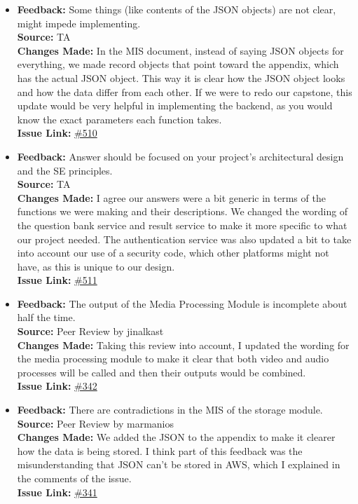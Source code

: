 \documentclass{article}
\begin{document}
\begin{itemize}
    \item
      \textbf{Feedback:} Some things (like contents of the JSON objects) are not clear, might impede implementing. \\
      \textbf{Source:} TA \\
      \textbf{Changes Made:} In the MIS document, instead of saying JSON objects for everything, we made record objects that point toward the appendix, which has the actual JSON object. This way it is clear how the JSON object looks and how the data differ from each other. If we were to redo our capstone, this update would be very helpful in implementing the backend, as you would know the exact parameters each function takes. \\
      \textbf{Issue Link:} \href{https://github.com/parishanizam/TeleHealth/issues/510}{\#510}
    
    \item
      \textbf{Feedback:} Answer should be focused on your project’s architectural design and the SE principles. \\
      \textbf{Source:} TA \\
      \textbf{Changes Made:} I agree our answers were a bit generic in terms of the functions we were making and their descriptions. We changed the wording of the question bank service and result service to make it more specific to what our project needed. The authentication service was also updated a bit to take into account our use of a security code, which other platforms might not have, as this is unique to our design. \\
      \textbf{Issue Link:} \href{https://github.com/parishanizam/TeleHealth/issues/511}{\#511}
    
    \item 
        \textbf{Feedback:} The output of the Media Processing Module is incomplete about half the time.\\
        \textbf{Source:} Peer Review by jinalkast\\
        \textbf{Changes Made:} Taking this review into account, I updated the wording for the media processing module to make it clear that both video and audio processes will be called and then their outputs would be combined.\\
        \textbf{Issue Link:} \href{https://github.com/parishanizam/TeleHealth/issues/342}{\#342}
    
    \item 
        \textbf{Feedback:} There are contradictions in the MIS of the storage module.\\
        \textbf{Source:} Peer Review by marmanios\\
        \textbf{Changes Made:} We added the JSON to the appendix to make it clearer how the data is being stored. I think part of this feedback was the misunderstanding that JSON can’t be stored in AWS, which I explained in the comments of the issue.\\
        \textbf{Issue Link:} \href{https://github.com/parishanizam/TeleHealth/issues/341}{\#341}
    

\end{itemize}
\end{document}
